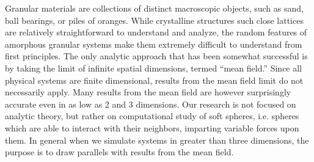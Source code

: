 Granular materials are collections of distinct macroscopic objects, such as sand, ball bearings, or piles of oranges. While crystalline structures such close lattices are relatively straightforward to understand and analyze, the random features of amorphous granular systems make them extremely difficult to understand from first principles. The only analytic approach that has been somewhat successful is by taking the limit of infinite spatial dimensions, termed ``mean field.'' Since all physical systems are finite dimensional, results from the mean field limit do not necessarily apply. Many results from the mean field are however surprisingly accurate even in as low as 2 and 3 dimensions. Our research is not focused on analytic theory, but rather on computational study of soft spheres, i.e. spheres which are able to interact with their neighbors, imparting variable forces upon them. %
In general when we simulate systems in greater than three dimensions, the purpose is to draw parallels with results from the mean field.


